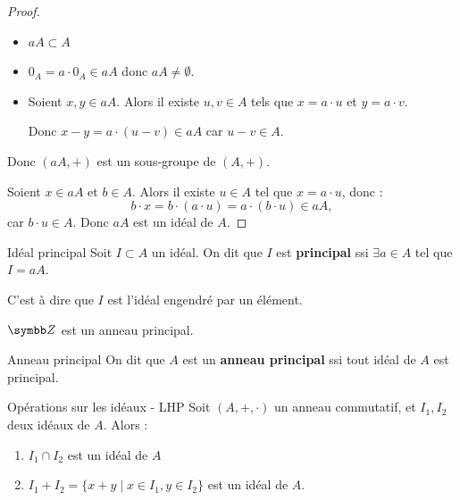\begin{proof}~\\
    \begin{itemize}
        \item $aA \subset A$ 
        \item $0_A = a \cdot 0_A \in aA$ donc $aA \neq \emptyset$.
        \item Soient $x, y \in aA$. Alors il existe $u, v \in A$ tels que $x = a \cdot u$ et $y = a \cdot v$.
        
        Donc $x - y = a \cdot (u - v) \in aA$ car $u - v \in A$.

    \end{itemize}

    Donc $(aA, +)$ est un sous-groupe de $(A, +)$.

    Soient $x \in aA$ et $b \in A$. Alors il existe $u \in A$ tel que $x = a \cdot u$, donc :
    \[b \cdot x = b \cdot (a \cdot u) = a \cdot (b \cdot u) \in aA,\]
    car $b \cdot u \in A$.
    Donc $aA$ est un idéal de $A$.
\end{proof}

\begin{definition}{Idéal principal}{}
    Soit $I \subset A$ un idéal. On dit que $I$
    est \textbf{principal} ssi $\exists a \in A$ tel que $I = aA$.

    C'est à dire que $I$ est l'idéal engendré par un élément.
\end{definition}

\begin{exemple}
    $\Z$ est un anneau principal.
\end{exemple}

\begin{definition}{Anneau principal}{}
    On dit que $A$ est un \textbf{anneau principal} ssi tout
    idéal de $A$ est principal.
\end{definition}

\begin{proposition}{Opérations sur les idéaux - LHP}{}
    Soit $(A, +, \cdot)$ un anneau commutatif, et $I_1, I_2$ deux idéaux de $A$. Alors :
    \begin{enumerate}
        \item $I_1 \cap I_2$ est un idéal de $A$
        \item $I_1 + I_2 = \{x + y \mid x \in I_1, y \in I_2\}$ est un idéal de $A$.
    \end{enumerate}
\end{proposition}

